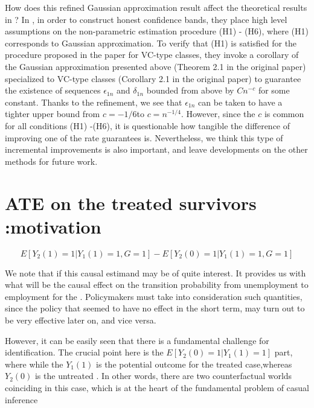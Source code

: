 \documentclass[uplatex,dvipdfmx]{jsarticle}
\begin{document}
\begin{remark}
    How does this refined Gaussian approximation result affect the theoretical results in \cite{chernozhukov2014anti}? In \cite{chernozhukov2014anti}, in order to construct honest confidence bands, they place high level assumptions on the non-parametric estimation procedure (H1) - (H6), where (H1) corresponds to Gaussian approximation. To verify that (H1) is satisfied for the procedure proposed in the paper for VC-type classes, they invoke a corollary of the Gaussian approximation presented above (Theorem 2.1 in the original paper) specialized to VC-type classes (Corollary 2.1 in the original paper) to guarantee the existence of sequences $\epsilon_{1n} $ and $\delta_{1n}$ bounded from above by $C n^{-c} $ for some constant. Thanks to the refinement, we see that $\epsilon_{1n}$ can be taken to have a tighter upper bound from $c = {-1/6} $to $c= n^{-1/4} $. However, since the $c$ is common for all conditions (H1) -(H6), it is questionable how tangible the difference of improving one of the rate guarantees is. Nevertheless, we think this type of incremental improvements is also important, and leave developments on the other methods for future work.
\end{remark}

\section{ATE on the treated survivors :motivation}
\label{sec: atets1}
\begin{definition}
    \[E[Y_2(1) =1| Y_1(1)=1, G=1 ] - E[ Y_2(0) = 1 | Y_1(1) =1, G=1]\]
\end{definition}

We note that if this causal estimand may be of quite interest. It provides us with what will be the causal effect on the transition probability from unemployment to employment for the . Policymakers must take into consideration such quantities, since the policy that seemed to have no effect in the short term, may turn out to be very effective later on, and vice versa.

However, it can be easily seen that there is a fundamental challenge for identification.
The crucial point here is the $ E [ Y_2(0) = 1 | Y_1(1) = 1] $ part, where while the $Y_1(1) $ 
is the potential outcome for the treated case,whereas $ Y_2(0) $ is the untreated . In other words, there are two counterfactual worlds coinciding in this case, which is at the heart of the fundamental problem of casual inference \cite{imbens2015causal}
\end{document}
